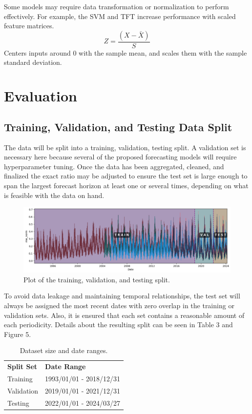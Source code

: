\documentclass[sigconf]{acmart}
\begin{document}
Some models may require data transformation or normalization to perform effectively. For example, the SVM and TFT increase performance with scaled feature matrices. $$Z = \frac{(X - \bar{X})}{S}$$ 
Centers inputs around 0 with the sample mean, and scales them with the sample standard deviation.

\section{Evaluation}

\subsection{Training, Validation, and Testing Data Split}
The data will be split into a training, validation, testing split. A validation set is necessary here because several of the proposed forecasting models will require hyperparameter tuning. Once the data has been aggregated, cleaned, and finalized the exact ratio may be adjusted to ensure the test set is large enough to span the largest forecast horizon at least one or several times, depending on what is feasible with the data on hand.

  \begin{figure}[hbt!]
    \includegraphics[width=\columnwidth]{Images/Split_Plot.png}
    \caption{Plot of the training, validation, and testing split.}
    \Description{}
    \label{fig:split}
  \end{figure}
 
To avoid data leakage and maintaining temporal relationships, the test set will always be assigned the most recent dates with zero overlap in the training or validation sets. Also, it is ensured that each set contains a reasonable amount of each periodicity. Details about the resulting split can be seen in Table 3 and Figure 5.


  \begin{table}[hbt!]
\centering
\caption{Dataset size and date ranges.}
\begin{tabular}{ll}
\toprule
\textbf{Split Set} & \textbf{Date Range} \\
\cmidrule(rl){1-1}\cmidrule(rl){2-2}
  Training & 1993/01/01 - 2018/12/31 \\
  Validation & 2019/01/01 - 2021/12/31  \\   
  Testing & 2022/01/01 - 2024/03/27  \\   
  \bottomrule
\end{tabular}
\end{table}
\end{document}
